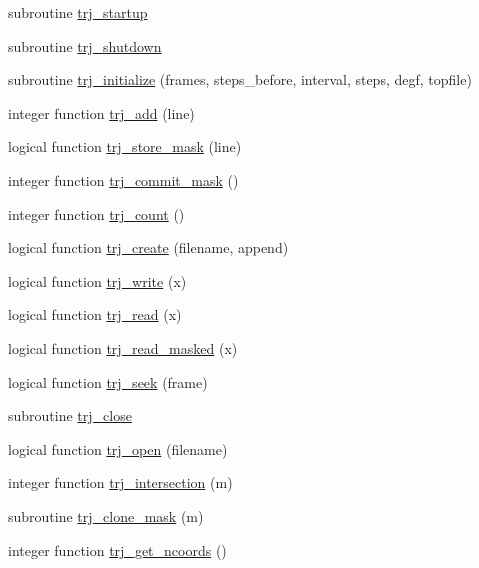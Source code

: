 \begin{DoxyCompactItemize}
\item 
subroutine \hyperlink{classtrj_ac2cea4791f8b811a8e9b038a59908963}{trj\-\_\-startup}
\item 
subroutine \hyperlink{classtrj_a2cbeb84073441231eb32be6f80973e7b}{trj\-\_\-shutdown}
\item 
subroutine \hyperlink{classtrj_abcf23ced3af3d82b27dbbfdf91f31393}{trj\-\_\-initialize} (frames, steps\-\_\-before, interval, steps, degf, topfile)
\item 
integer function \hyperlink{classtrj_a090f629c6d536bbbaf10af9cb1d1817b}{trj\-\_\-add} (line)
\item 
logical function \hyperlink{classtrj_a0c43dcbbc26496b078c8d399b398cb81}{trj\-\_\-store\-\_\-mask} (line)
\item 
integer function \hyperlink{classtrj_a669ab3f6f68c9cf432f173c4e804b2f9}{trj\-\_\-commit\-\_\-mask} ()
\item 
integer function \hyperlink{classtrj_a181aca36b221a4af4cf2d745dbd4c185}{trj\-\_\-count} ()
\item 
logical function \hyperlink{classtrj_a72516f37b9a143c27a8a9e45df27519f}{trj\-\_\-create} (filename, append)
\item 
logical function \hyperlink{classtrj_a797d718bd3b346b77a87aee5723ffcb1}{trj\-\_\-write} (x)
\item 
logical function \hyperlink{classtrj_a87cdf9b41b59045660320062201537c0}{trj\-\_\-read} (x)
\item 
logical function \hyperlink{classtrj_a950c6a0d068db4209e6d39114f00cb77}{trj\-\_\-read\-\_\-masked} (x)
\item 
logical function \hyperlink{classtrj_aed24428056be0d708702ac92c8a24d83}{trj\-\_\-seek} (frame)
\item 
subroutine \hyperlink{classtrj_a0e950363c678b3b896b3484d1ffa298e}{trj\-\_\-close}
\item 
logical function \hyperlink{classtrj_a28cdf7fe7d02d22fcf44b14c41cd292c}{trj\-\_\-open} (filename)
\item 
integer function \hyperlink{classtrj_a2288d2cdb7b4f1a65d5312755da66ddc}{trj\-\_\-intersection} (m)
\item 
subroutine \hyperlink{classtrj_a1bd89f778d5dd14a2421d35992034fdb}{trj\-\_\-clone\-\_\-mask} (m)
\item 
integer function \hyperlink{classtrj_aa27536bb45c1a940e73a162e2ebc02c3}{trj\-\_\-get\-\_\-ncoords} ()
\end{DoxyCompactItemize}
